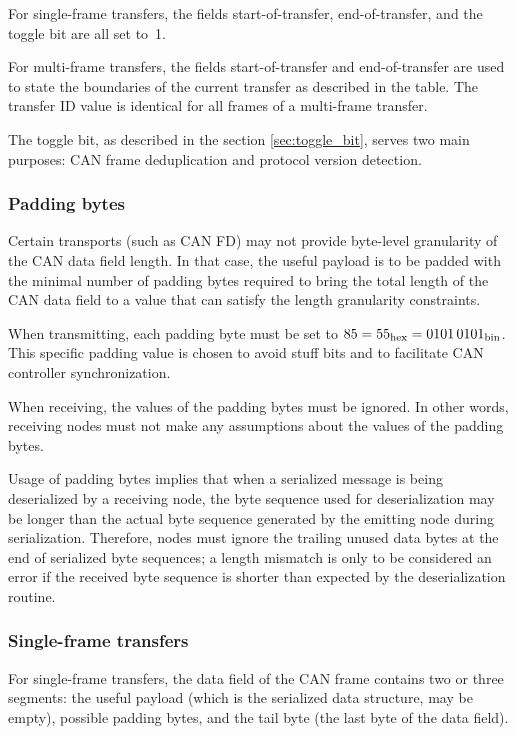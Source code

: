 For single-frame transfers, the fields start-of-transfer, end-of-transfer, and the toggle bit
are all set to~1.

For multi-frame transfers, the fields start-of-transfer and end-of-transfer
are used to state the boundaries of the current transfer as described in the table.
The transfer ID value is identical for all frames of a multi-frame transfer.

The toggle bit, as described in the section \ref{sec:toggle_bit}, serves
two main purposes: CAN frame deduplication and protocol version detection.

\subsubsection{Padding bytes}

Certain transports (such as CAN FD) may not provide byte-level granularity of the CAN data field length.
In that case, the useful payload is to be padded with the minimal number of padding bytes required
to bring the total length of the CAN data field to a value that can satisfy the length granularity constraints.

When transmitting, each padding byte must be set to $\text{85} = \text{55}_\text{hex} = \text{0101\,0101}_\text{bin}$.
This specific padding value is chosen to avoid stuff bits and to facilitate CAN controller synchronization.

When receiving, the values of the padding bytes must be ignored.
In other words, receiving nodes must not make any assumptions about the values of the
padding bytes.

Usage of padding bytes implies that when a serialized message is being deserialized by a receiving node,
the byte sequence used for deserialization may be longer than the actual byte sequence generated by the
emitting node during serialization.
Therefore, nodes must ignore the trailing unused data bytes at the end of serialized byte sequences;
a length mismatch is only to be considered an error if the received byte sequence is shorter
than expected by the deserialization routine.

\subsubsection{Single-frame transfers}

For single-frame transfers, the data field of the CAN frame contains two or three segments:
the useful payload (which is the serialized data structure, may be empty), possible padding bytes,
and the tail byte (the last byte of the data field).

